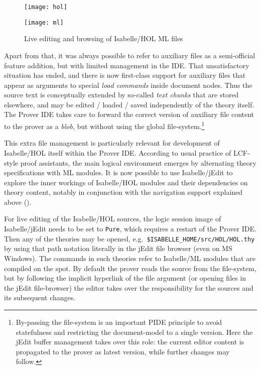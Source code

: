 \begin{isabellebody}
\begin{isamarkuptext}
\begin{figure}[!htbp]
\begin{center}
\texttt{[image: hol]}

\vspace*{1ex}

\texttt{[image: ml]}
\end{center}
\caption{Live editing and browsing of Isabelle/HOL ML files}
\label{fig:ml}
\end{figure}

Apart from that, it was always possible to refer to auxiliary files as a
semi-official feature addition, but with limited management in the IDE. That
unsatisfactory situation has ended, and there is now first-class support for
auxiliary files that appear as arguments to special \emph{load commands}
inside document nodes. Thus the source text is conceptually extended by
so-called \emph{text chunks} that are stored elsewhere, and may be edited /
loaded / saved independently of the theory itself. The Prover IDE takes care
to forward the correct version of auxiliary file content to the prover as a
\emph{blob}, but without using the global file-system.\footnote{By-passing
the file-system is an important PIDE principle to avoid statefulness and
restricting the document-model to a single version. Here the jEdit buffer
management takes over this role: the current editor content is propagated to
the prover as latest version, while further changes may follow.}

\medskip This extra file management is particularly relevant for development
of Isabelle/HOL itself within the Prover IDE. According to usual practice of
LCF-style proof assistants, the main logical environment emerges by
alternating theory specifications with ML modules. It is now possible to use
Isabelle/jEdit to explore the inner workings of Isabelle/HOL modules and
their dependencies on theory content, notably in conjunction with the
navigation support explained above ().

For live editing of the Isabelle/HOL sources, the logic session image of
Isabelle/jEdit needs to be set to \verb|Pure|, which requires a restart
of the Prover IDE. Then any of the theories may be opened, e.g.\ \verb|$ISABELLE_HOME|\verb|/|\discretionary{}{}{}\verb|src|\verb|/|\discretionary{}{}{}\verb|HOL|\verb|/|\discretionary{}{}{}\verb|HOL.thy| by using that path notation literally in
the jEdit file browser (even on MS Windows). The \hyperlink{command.ML-file}{\mbox{}} commands
in such theories refer to Isabelle/ML modules that are compiled on the spot.
By default the prover reads the source from the file-system, but by
following the implicit hyperlink of the file argument (or opening files in
the jEdit file-browser) the editor takes over the responsibility for the
sources and its subsequent changes.


\end{isamarkuptext}
\end{isabellebody}
